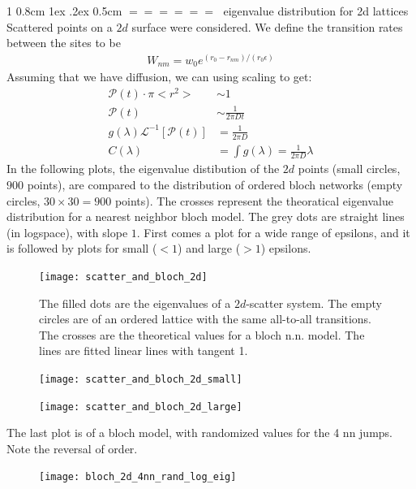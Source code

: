 \documentclass[onecolumn,fleqn,notitlepage,secnumarabic]{revtex4}
\makeatletter
\def\section{%
  \@startsection
    {section}%
    {1}%
    {\z@}%
    {0.8cm \@plus1ex \@minus .2ex}%
    {0.5cm}%
    {\Large\bf $=\!=\!=\!=\!=\!=\;$}%
}%
\makeatother
\begin{document}
\section{eigenvalue distribution for 2d lattices}
Scattered points on a $2d$ surface were considered. We define the transition rates between the sites to be 
\begin{align}   W_{nm} = w_0 e^{(r_0 - r_{nm})/(r_0\epsilon)} \end{align}  
Assuming that we have diffusion, we can using scaling to get:
\begin{align} 
    \mathcal{P}(t) \cdot \pi <r^2> &\sim 1 \\
    \mathcal{P}(t) &\sim \frac{1}{2\pi Dt}\\
    g(\lambda)\mathcal{L}^{-1}\left[\mathcal{P}(t)\right]&= \frac{1}{2\pi D} \\
    C(\lambda) &= \int g(\lambda) = \frac{1}{2\pi D}\lambda
\end{align}
In the following plots, the eigenvalue distibution of the $2d$ points (small circles, $900$ points), are compared to the distribution of ordered bloch networks (empty circles, $30\times30=900$ points). The crosses represent the theoratical eigenvalue distribution for a nearest neighbor bloch model. The grey dots are straight lines (in logspace), with slope $1$. First comes a plot for a wide range of epsilons, and it is followed by plots for small ($<1$) and large ($>1$) epsilons.

\begin{figure}[H]
\texttt{[image: scatter\_and\_bloch\_2d]}
\caption{The filled dots are the eigenvalues of a $2d$-scatter system. The empty circles are of an ordered lattice with the same all-to-all transitions. The crosses are the theoretical values for a bloch n.n. model. The lines are fitted linear lines with tangent 1.}
\end{figure}
\begin{figure}[H]
\texttt{[image: scatter\_and\_bloch\_2d\_small]}
\caption{}
\end{figure}
\begin{figure}[H]
\texttt{[image: scatter\_and\_bloch\_2d\_large]}
\end{figure}



The last plot is of a bloch model, with randomized values for the 4 nn jumps. Note the reversal of order.
\begin{figure}[H]
\texttt{[image: bloch\_2d\_4nn\_rand\_log\_eig]}
\end{figure}
\end{document}
